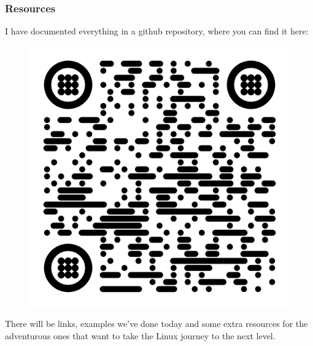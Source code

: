 \documentclass{beamer}
\begin{document}
%
%
%
%

\begin{frame}
    \frametitle{Resources}
    \small
    I have documented everything in a github repository, where you can find it here:
    \begin{figure}

        \includegraphics[width=0.4\linewidth]{qr-github}

        \label{fig:qr-github}

    \end{figure}
    \centering \small There will be links, examples we've done today and some
    extra resources for the adventurous ones that want to take the Linux
    journey to the next level.

\end{frame}
\end{document}
